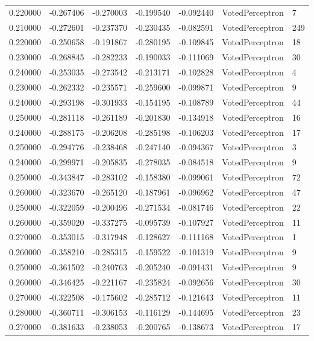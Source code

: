 \begin{tabular}{rrrrrll}
0.220000 & -0.267406 & -0.270003 & -0.199540 & -0.092440 & VotedPerceptron & 7 \\
0.210000 & -0.272601 & -0.237370 & -0.230435 & -0.082591 & VotedPerceptron & 249 \\
0.220000 & -0.250658 & -0.191867 & -0.280195 & -0.109845 & VotedPerceptron & 18 \\
0.230000 & -0.268845 & -0.282233 & -0.190033 & -0.111069 & VotedPerceptron & 30 \\
0.240000 & -0.253035 & -0.273542 & -0.213171 & -0.102828 & VotedPerceptron & 4 \\
0.230000 & -0.262332 & -0.235571 & -0.259600 & -0.099871 & VotedPerceptron & 9 \\
0.240000 & -0.293198 & -0.301933 & -0.154195 & -0.108789 & VotedPerceptron & 44 \\
0.250000 & -0.281118 & -0.261189 & -0.201830 & -0.134918 & VotedPerceptron & 16 \\
0.240000 & -0.288175 & -0.206208 & -0.285198 & -0.106203 & VotedPerceptron & 17 \\
0.250000 & -0.294776 & -0.238468 & -0.247140 & -0.094367 & VotedPerceptron & 3 \\
0.240000 & -0.299971 & -0.205835 & -0.278035 & -0.084518 & VotedPerceptron & 9 \\
0.250000 & -0.343847 & -0.283102 & -0.158380 & -0.099061 & VotedPerceptron & 72 \\
0.260000 & -0.323670 & -0.265120 & -0.187961 & -0.096962 & VotedPerceptron & 47 \\
0.250000 & -0.322059 & -0.200496 & -0.271534 & -0.081746 & VotedPerceptron & 22 \\
0.260000 & -0.359020 & -0.337275 & -0.095739 & -0.107927 & VotedPerceptron & 11 \\
0.270000 & -0.353015 & -0.317948 & -0.128627 & -0.111168 & VotedPerceptron & 1 \\
0.260000 & -0.358210 & -0.285315 & -0.159522 & -0.101319 & VotedPerceptron & 9 \\
0.250000 & -0.361502 & -0.240763 & -0.205240 & -0.091431 & VotedPerceptron & 9 \\
0.260000 & -0.346425 & -0.221167 & -0.235824 & -0.092656 & VotedPerceptron & 30 \\
0.270000 & -0.322508 & -0.175602 & -0.285712 & -0.121643 & VotedPerceptron & 11 \\
0.280000 & -0.360711 & -0.306153 & -0.116129 & -0.144695 & VotedPerceptron & 23 \\
0.270000 & -0.381633 & -0.238053 & -0.200765 & -0.138673 & VotedPerceptron & 17 \\

\end{tabular}
